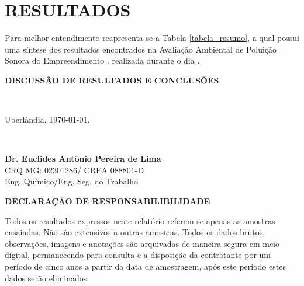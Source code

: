 
\newpage
\chapter*{RESULTADOS}
\begin{SingleSpace}
Para melhor entendimento reapresenta-se a Tabela \ref{tabela_resumo}, a qual possui uma síntese dos resultados encontrados na Avaliação Ambiental de Poluição Sonora do Empreendimento \textbf{}. realizada durante o dia \textbf{}.



\newpage

\textbf{DISCUSSÃO DE RESULTADOS E CONCLUSÕES}



\

Uberlândia, \today .

\

\begin{center}
\textbf{Dr. Euclides Antônio Pereira de Lima} \\
CRQ MG: 02301286/ CREA 088801-D \\
Eng. Químico/Eng. Seg. do Trabalho \\
\end{center}

\textbf{DECLARAÇÃO DE RESPONSABILIBILIDADE}

Todos os resultados expressos neste relatório referem-se apenas as amostras ensaiadas. Não são extensivos a outras amostras.
Todos os dados brutos, observações, imagens e anotações são arquivadas de maneira segura em meio digital, permanecendo para consulta e a disposição da contratante por um período de cinco anos a partir da data de amostragem, após este período estes dados serão eliminados.

\end{SingleSpace}